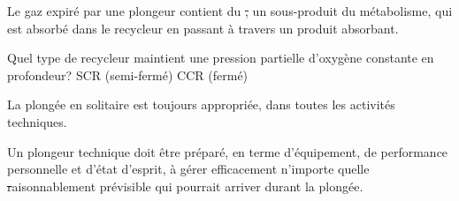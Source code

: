 \documentclass[english,10pt,a4paper]{article}
\begin{document}
\begin{outline}
		\1 Le gaz expiré par une plongeur contient du \st, un sous-produit du métabolisme, qui est absorbé dans le recycleur en passant à travers un produit absorbant.
		\vspace{1cm}

		\1 Quel type de recycleur maintient une pression partielle d'oxygène constante en profondeur?
			\2 SCR (semi-fermé)
			\2 CCR (fermé)

		\1 La plongée en solitaire est toujours appropriée, dans toutes les activités techniques.\vf

		\1 Un plongeur technique doit être préparé, en terme d'équipement, de performance personnelle et d'état d'esprit, à gérer efficacement n'importe quelle \st raisonnablement prévisible qui pourrait arriver durant la plongée.
		\vspace{1cm}
	\end{outline}
	\sectionpage
\end{document}
